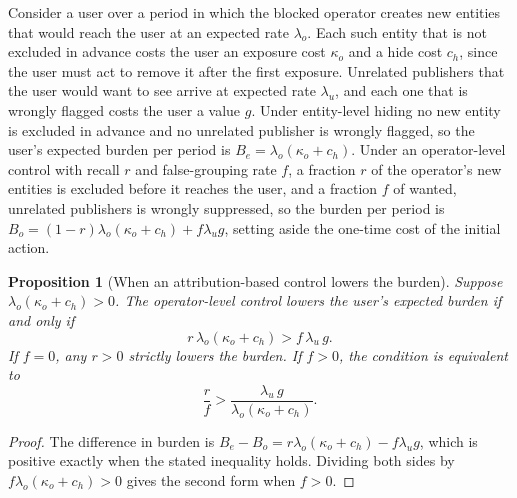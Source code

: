 \documentclass[11pt]{article}
\newtheorem{proposition}{Proposition}
\theoremstyle{definition}
\begin{document}
Consider a user over a period in which the blocked operator creates new entities that would reach the user at an expected rate $\lambda_o$. Each such entity that is not excluded in advance costs the user an exposure cost $\kappa_o$ and a hide cost $c_h$, since the user must act to remove it after the first exposure. Unrelated publishers that the user would want to see arrive at expected rate $\lambda_u$, and each one that is wrongly flagged costs the user a value $g$. Under entity-level hiding no new entity is excluded in advance and no unrelated publisher is wrongly flagged, so the user's expected burden per period is $B_e=\lambda_o(\kappa_o+c_h)$. Under an operator-level control with recall $r$ and false-grouping rate $f$, a fraction $r$ of the operator's new entities is excluded before it reaches the user, and a fraction $f$ of wanted, unrelated publishers is wrongly suppressed, so the burden per period is $B_o=(1-r)\lambda_o(\kappa_o+c_h)+f\lambda_u g$, setting aside the one-time cost of the initial action.

\begin{proposition}[When an attribution-based control lowers the burden]\label{prop:attr}
Suppose $\lambda_o(\kappa_o+c_h)>0$. The operator-level control lowers the user's expected burden if and only if
\[
r\,\lambda_o(\kappa_o+c_h)>f\,\lambda_u\,g .
\]
If $f=0$, any $r>0$ strictly lowers the burden. If $f>0$, the condition is equivalent to
\[
\frac{r}{f}>\frac{\lambda_u\,g}{\lambda_o(\kappa_o+c_h)} .
\]
\end{proposition}

\begin{proof}
The difference in burden is $B_e-B_o=r\lambda_o(\kappa_o+c_h)-f\lambda_u g$, which is positive exactly when the stated inequality holds. Dividing both sides by $f\lambda_o(\kappa_o+c_h)>0$ gives the second form when $f>0$.
\end{proof}
\end{document}
